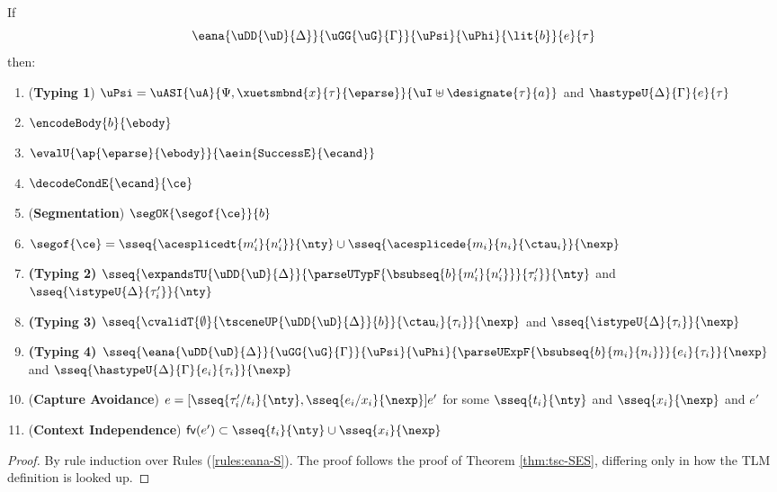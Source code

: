 \begin{theorem}
\label{thm:tsc-B}
If \[\eana{\uDD{\uD}{\Delta}}{\uGG{\uG}{\Gamma}}{\uPsi}{\uPhi}{\lit{b}}{e}{\tau}\] then:
\begin{enumerate}
\item (\textbf{Typing 1}) $\uPsi = \uASI{\uA}{\Psi, \xuetsmbnd{x}{\tau}{\eparse}}{\uI \uplus \designate{\tau}{a}}$ and $\hastypeU{\Delta}{\Gamma}{e}{\tau}$
\item $\encodeBody{b}{\ebody}$
\item $\evalU{\ap{\eparse}{\ebody}}{\aein{\mathtt{SuccessE}}{\ecand}}$
\item $\decodeCondE{\ecand}{\ce}$
\item (\textbf{Segmentation}) $\segOK{\segof{\ce}}{b}$
\item $\segof{\ce} = \sseq{\acesplicedt{m'_i}{n'_i}}{\nty} \cup \sseq{\acesplicede{m_i}{n_i}{\ctau_i}}{\nexp}$
\item \textbf{(Typing 2)} $\sseq{
      \expandsTU{\uDD{\uD}{\Delta}}
      {
        \parseUTypF{\bsubseq{b}{m'_i}{n'_i}}
      }{\tau'_i}
    }{\nty}$ and $\sseq{\istypeU{\Delta}{\tau'_i}}{\nty}$
\item \textbf{(Typing 3)} $\sseq{
  \cvalidT{\emptyset}{
    \tsceneUP
      {\uDD
        {\uD}{\Delta}
      }{b}
  }{
    \ctau_i
  }{\tau_i}
}{\nexp}$ and $\sseq{\istypeU{\Delta}{\tau_i}}{\nexp}$
\item \textbf{(Typing 4)} $\sseq{
  \eana
    {\uDD{\uD}{\Delta}}
    {\uGG{\uG}{\Gamma}}
    {\uPsi}
    {\uPhi}
    {\parseUExpF{\bsubseq{b}{m_i}{n_i}}}
    {e_i}
    {\tau_i}
}{\nexp}$ and $\sseq{\hastypeU{\Delta}{\Gamma}{e_i}{\tau_i}}{\nexp}$
\item (\textbf{Capture Avoidance}) $e = [\sseq{\tau'_i/t_i}{\nty}, \sseq{e_i/x_i}{\nexp}]e'$ for some $\sseq{t_i}{\nty}$ and $\sseq{x_i}{\nexp}$ and $e'$
\item (\textbf{Context Independence}) $\mathsf{fv}(e') \subset \sseq{t_i}{\nty} \cup \sseq{x_i}{\nexp}$
\end{enumerate}
\end{theorem}
\begin{proof} By rule induction over Rules (\ref{rules:eana-S}). The proof follows the proof of Theorem \ref{thm:tsc-SES}, differing only in how the TLM definition is looked up.
\end{proof}



